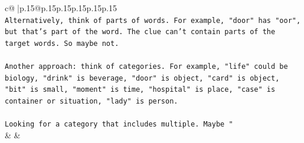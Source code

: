 \documentclass{article}
\begin{document}
{\begin{supertabular}{c@{$\;$}|p{.15\linewidth}@{}p{.15\linewidth}p{.15\linewidth}p{.15\linewidth}p{.15\linewidth}p{.15\linewidth}}
{{{\\ 
\texttt{Alternatively, think of parts of words. For example, "door" has "oor", but that's part of the word. The clue can't contain parts of the target words. So maybe not.} \\
\\ 
\texttt{Another approach: think of categories. For example, "life" could be biology, "drink" is beverage, "door" is object, "card" is object, "bit" is small, "moment" is time, "hospital" is place, "case" is container or situation, "lady" is person.} \\
\\ 
\texttt{Looking for a category that includes multiple. Maybe "} \\
            }
        }
    }
    & & \\ \\


\end{supertabular}}
\end{document}
